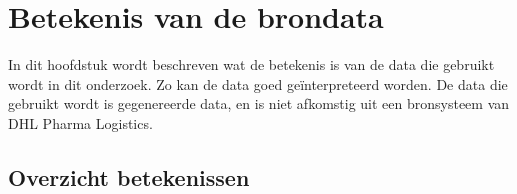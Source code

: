 \chapter{Betekenis van de brondata}
\label{ch:betekenisdata}
In dit hoofdstuk wordt beschreven wat de betekenis is van de data die gebruikt wordt in dit onderzoek. Zo kan de data goed geïnterpreteerd worden. De data die gebruikt wordt is gegenereerde data, en is niet afkomstig uit een bronsysteem van DHL Pharma Logistics.

\section{Overzicht betekenissen}
